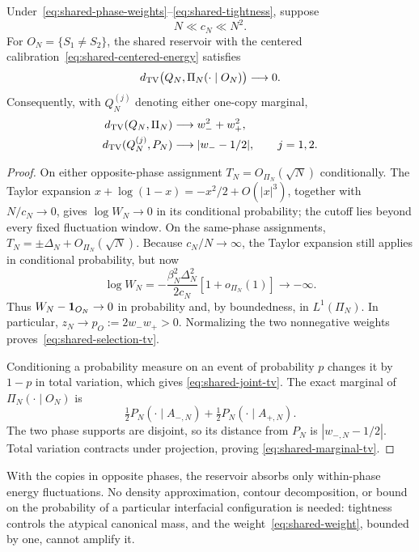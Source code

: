 \begin{theorem}
\label{thm:shared-selection}
Under~\eqref{eq:shared-phase-weights}--\eqref{eq:shared-tightness},
suppose
\begin{equation}
 N\ll c_N\ll N^2.
 \label{eq:shared-window}
\end{equation}
For $O_N=\{S_1\ne S_2\}$, the shared reservoir with the centered
calibration~\eqref{eq:shared-centered-energy} satisfies
\begin{equation}
 d_{\mathrm{TV}}\bigl(Q_N,\Pi_N(\cdot\mid O_N)\bigr)\longrightarrow0.
 \label{eq:shared-selection-tv}
\end{equation}
Consequently, with $Q_N^{(j)}$ denoting either one-copy marginal,
\begin{align}
 d_{\mathrm{TV}}(Q_N,\Pi_N)&\longrightarrow w_-^2+w_+^2,
 \label{eq:shared-joint-tv}\\
 d_{\mathrm{TV}}(Q_N^{(j)},P_N)&\longrightarrow |w_--1/2|,
 \qquad j=1,2.
 \label{eq:shared-marginal-tv}
\end{align}
\end{theorem}
\begin{proof}
On either opposite-phase assignment $T_N=O_{\Pi_N}(\sqrt N)$
conditionally. The Taylor expansion
$x+\log(1-x)=-x^2/2+O(|x|^3)$, together with $N/c_N\to0$, gives
$\log W_N\to0$ in its conditional probability; the cutoff lies beyond
every fixed fluctuation window. On the same-phase assignments,
$T_N=\pm\Delta_N+O_{\Pi_N}(\sqrt N)$. Because $c_N/N\to\infty$,
the Taylor expansion still applies in conditional probability, but now
\[
 \log W_N=-\frac{\beta_N^2\Delta_N^2}{2c_N}[1+o_{\Pi_N}(1)]
            \longrightarrow-\infty.
\]
Thus $W_N-\mathbf 1_{O_N}\to0$ in probability and, by boundedness, in
$L^1(\Pi_N)$. In particular,
$z_N\to p_O:=2w_-w_+>0$. Normalizing the two nonnegative weights
proves~\eqref{eq:shared-selection-tv}.

Conditioning a probability measure on an event of probability $p$
changes it by $1-p$ in total variation, which gives
\eqref{eq:shared-joint-tv}. The exact marginal of
$\Pi_N(\cdot\mid O_N)$ is
\[
 \tfrac12P_N(\cdot\mid A_{-,N})+
 \tfrac12P_N(\cdot\mid A_{+,N}).
\]
The two phase supports are disjoint, so its distance from $P_N$ is
$|w_{-,N}-1/2|$. Total variation contracts under projection, proving
\eqref{eq:shared-marginal-tv}.
\end{proof}

With the copies in opposite phases, the reservoir absorbs only
within-phase energy fluctuations. No density approximation, contour
decomposition, or bound on the probability of a particular interfacial
configuration is needed: tightness controls the atypical canonical
mass, and the weight~\eqref{eq:shared-weight}, bounded by one, cannot
amplify it.

